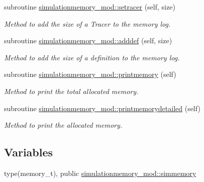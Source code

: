 \begin{DoxyCompactItemize}
subroutine \mbox{\hyperlink{namespacesimulationmemory__mod_a3209dc0fdd14fe4a6190e67607076f65}{simulationmemory\+\_\+mod\+::setracer}} (self, size)
\begin{DoxyCompactList}\small\item\em Method to add the size of a Tracer to the memory log. \end{DoxyCompactList}\item 
subroutine \mbox{\hyperlink{namespacesimulationmemory__mod_a0812b4222f930cfb142586f47b2de0da}{simulationmemory\+\_\+mod\+::adddef}} (self, size)
\begin{DoxyCompactList}\small\item\em Method to add the size of a definition to the memory log. \end{DoxyCompactList}\item 
subroutine \mbox{\hyperlink{namespacesimulationmemory__mod_a5b7c22d236e24b59599f705f63ba3c09}{simulationmemory\+\_\+mod\+::printmemory}} (self)
\begin{DoxyCompactList}\small\item\em Method to print the total allocated memory. \end{DoxyCompactList}\item 
subroutine \mbox{\hyperlink{namespacesimulationmemory__mod_a9e12442b1b7b5d105cd70686e04106d3}{simulationmemory\+\_\+mod\+::printmemorydetailed}} (self)
\begin{DoxyCompactList}\small\item\em Method to print the allocated memory. \end{DoxyCompactList}\end{DoxyCompactItemize}
\subsection*{Variables}
\begin{DoxyCompactItemize}
\item 
type(memory\+\_\+t), public \mbox{\hyperlink{namespacesimulationmemory__mod_a47d351637c32a0493b99ed3fb269f22c}{simulationmemory\+\_\+mod\+::simmemory}}
\end{DoxyCompactItemize}
